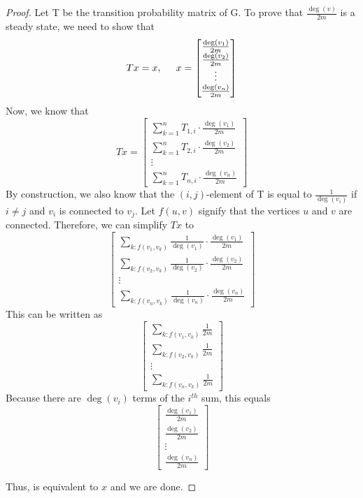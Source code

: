\documentclass[boxes]{rutgers_hw}
\begin{document}
  \begin{exern}{2}
    
  \end{exern}
  \begin{proof}
    Let T be the transition probability matrix of G. To prove that $\frac{\deg(v)}{2m}$ is a steady state, we need to show that
    \[ 
      Tx = x, \hspace{5 mm} x = 
      \begin{bmatrix}
        \frac{\deg(v_1)}{2m} \\ \frac{\deg(v_2)}{2m} \\ \vdots \\ \frac{\deg(v_n)}{2m}
      \end{bmatrix}
    \]
    Now, we know that
    \[
      Tx = 
      \begin{bmatrix}
        \sum_{k=1}^n T_{1,i} \cdot \frac{\deg(v_1)}{2m} \\
        \sum_{k=1}^n T_{2,i} \cdot \frac{\deg(v_2)}{2m} \\
        \vdots \\
        \sum_{k=1}^n T_{n,i} \cdot \frac{\deg(v_n)}{2m}
      \end{bmatrix}
    \]
    By construction, we also know that the $(i,j)$-element of T is equal to $\frac{1}{\deg(v_i)}$ if $i \neq j$ and $v_i$ is connected to $v_j$.
    Let $f(u,v)$ signify that the vertices $u$ and $v$ are connected. 
    Therefore, we can simplify $Tx$ to 
    \[ 
      \begin{bmatrix}
        \sum_{k:f(v_1,v_k)} \frac{1}{\deg(v_1)} \cdot \frac{\deg(v_1)}{2m} \\
        \sum_{k:f(v_2,v_k)} \frac{1}{\deg(v_2)} \cdot \frac{\deg(v_2)}{2m} \\
        \vdots \\
        \sum_{k:f(v_n,v_k)} \frac{1}{\deg(v_n)} \cdot \frac{\deg(v_n)}{2m}
      \end{bmatrix}
    \]
    This can be written as
    \[ 
      \begin{bmatrix}
        \sum_{k:f(v_1,v_k)} \frac{1}{2m} \\
        \sum_{k:f(v_2,v_k)} \frac{1}{2m} \\
        \vdots \\
        \sum_{k:f(v_n,v_k)} \frac{1}{2m}
      \end{bmatrix}
    \]
    Because there are $\deg(v_i)$ terms of the $i^{th}$ sum, this equals
    \[
      \begin{bmatrix}
        \frac{\deg(v_1)}{2m} \\ \frac{\deg(v_2)}{2m} \\ \vdots \\ \frac{\deg(v_n)}{2m}
      \end{bmatrix}
    \]

    Thus, is equivalent to $x$ and we are done.
    
  \end{proof}
\end{document}
